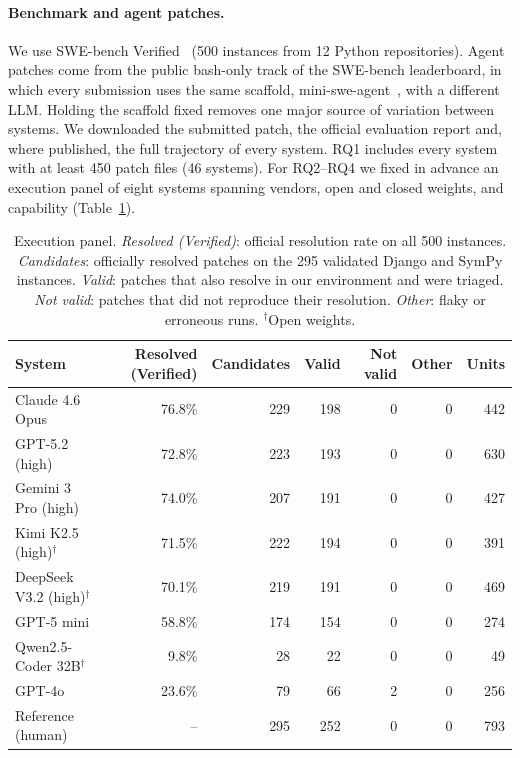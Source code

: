 \documentclass[a4paper,fleqn]{cas-sc}
\newcommand{\rqoneSystems}{46}
\begin{document}
\paragraph{Benchmark and agent patches.} We use SWE-bench Verified~\citep{chowdhury2024verified} (500 instances from 12 Python repositories). Agent patches come from the public bash-only track of the SWE-bench leaderboard, in which every submission uses the same scaffold, mini-swe-agent~\citep{miniswe2025}, with a different LLM. Holding the scaffold fixed removes one major source of variation between systems. We downloaded the submitted patch, the official evaluation report and, where published, the full trajectory of every system. RQ1 includes every system with at least 450 patch files (\rqoneSystems{} systems). For RQ2--RQ4 we fixed in advance an execution panel of eight systems spanning vendors, open and closed weights, and capability (Table~\ref{tab:panel}).

\begin{table}[t]
\caption{Execution panel. \emph{Resolved (Verified)}: official resolution rate on all 500 instances. \emph{Candidates}: officially resolved patches on the 295 validated Django and SymPy instances. \emph{Valid}: patches that also resolve in our environment and were triaged. \emph{Not valid}: patches that did not reproduce their resolution. \emph{Other}: flaky or erroneous runs. $^\dagger$Open weights.}
\label{tab:panel}
\centering\footnotesize
\begin{tabular}{lrrrrrr}
\toprule
System & Resolved (Verified) & Candidates & Valid & Not valid & Other & Units \\
\midrule
Claude 4.6 Opus & 76.8\% & 229 & 198 & 0 & 0 & 442 \\
GPT-5.2 (high) & 72.8\% & 223 & 193 & 0 & 0 & 630 \\
Gemini 3 Pro (high) & 74.0\% & 207 & 191 & 0 & 0 & 427 \\
Kimi K2.5 (high)$^\dagger$ & 71.5\% & 222 & 194 & 0 & 0 & 391 \\
DeepSeek V3.2 (high)$^\dagger$ & 70.1\% & 219 & 191 & 0 & 0 & 469 \\
GPT-5 mini & 58.8\% & 174 & 154 & 0 & 0 & 274 \\
Qwen2.5-Coder 32B$^\dagger$ & 9.8\% & 28 & 22 & 0 & 0 & 49 \\
GPT-4o & 23.6\% & 79 & 66 & 2 & 0 & 256 \\
Reference (human) & -- & 295 & 252 & 0 & 0 & 793 \\
\bottomrule
\end{tabular}
\end{table}
\end{document}
